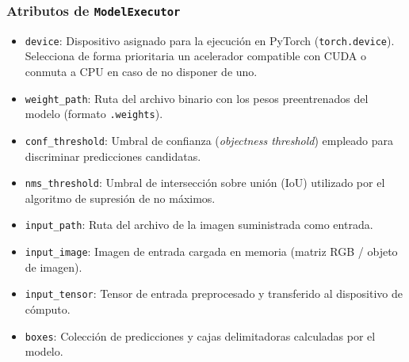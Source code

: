 \subsubsection*{Atributos de \texttt{ModelExecutor}}
\begin{itemize}
    \item \texttt{device}: Dispositivo asignado para la ejecución en PyTorch (\texttt{torch.device}). Selecciona de forma prioritaria un acelerador 
    compatible con CUDA o conmuta a CPU en caso de no disponer de uno.
    \item \texttt{weight\_path}: Ruta del archivo binario con los pesos preentrenados del modelo (formato \texttt{.weights}).
    \item \texttt{conf\_threshold}: Umbral de confianza (\textit{objectness threshold}) empleado para discriminar predicciones candidatas.
    \item \texttt{nms\_threshold}: Umbral de intersección sobre unión (IoU) utilizado por el algoritmo de supresión de no máximos.
    \item \texttt{input\_path}: Ruta del archivo de la imagen suministrada como entrada.
    \item \texttt{input\_image}: Imagen de entrada cargada en memoria (matriz RGB / objeto de imagen).
    \item \texttt{input\_tensor}: Tensor de entrada preprocesado y transferido al dispositivo de cómputo.
    \item \texttt{boxes}: Colección de predicciones y cajas delimitadoras calculadas por el modelo.
\end{itemize}

